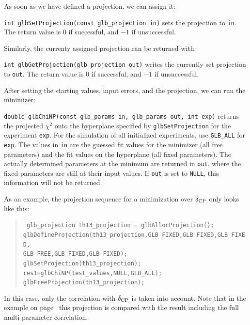 As soon as we have defined a projection, we can assign it:
\begin{function}
{\tt int glbSetProjection(const glb\_projection in)} sets the projection
to {\tt in}. The return value is $0$ if successful, and $-1$ if
unsuccessful.
\end{function}
Similarly, the currenty assigned projection can be returned with:
\begin{function}
{\tt int glbGetProjection(glb\_projection out)} writes the currently
set projection to {\tt out}. The return value is $0$ if successful, and $-1$ if unsuccessful.
\end{function}
After setting the starting values, input errors, and the projection, 
we can run the minimizer:
\begin{function}
{\tt double glbChiNP(const glb\_params in, glb\_params out, int exp)} 
returns the projected $\chi^2$ onto the hyperplane specified by 
{\tt glbSetProjection} for the  experiment {\tt exp}. 
For the simulation of all initialized experiments,
use {\tt GLB\_ALL} for {\tt exp}. The values in {\tt in} are the guessed fit values for the minimizer (all free parameters) and the fit values
on the hyperplane (all fixed parameters). The actually determined parameters at the minimum are returned in {\tt out}, where the fixed parameters are still at their input values. If {\tt out} is set to {\tt NULL}, this information will not be returned.
\end{function}
As an example, the projection sequence for a minimization over
$\delta_{\mathrm{CP}}$ only looks like this:
\begin{quote}
{\tt
  glb\_projection th13\_projection = glbAllocProjection(); \\
  glbDefineProjection(th13\_projection,GLB\_FIXED,GLB\_FIXED,GLB\_FIXED,\\
  \hspace*{2cm} GLB\_FREE,GLB\_FIXED,GLB\_FIXED); \\
  glbSetProjection(th13\_projection); \\ 
  res1=glbChiNP(test\_values,NULL,GLB\_ALL); \\
  glbFreeProjection(th13\_projection);
}
\end{quote}
In this case, only the correlation with $\delta_{\mathrm{CP}}$ is taken into account.
Note that in the  example on page~\pageref{ex:corrproj} this projection
is compared with the result including the full multi-parameter correlation.


